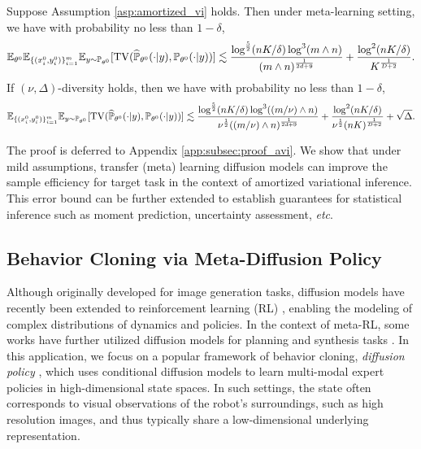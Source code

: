 \documentclass[11pt]{article}
\numberwithin{equation}{section}
\renewcommand{\P}{\mathbb{P}}
\begin{document}
\begin{thm}\label{thm:amortized_vi}
    Suppose Assumption \ref{asp:amortized_vi} holds. 
    Then under meta-learning setting, we have with probability no less than $1-\delta$,
    \begin{equation}
        \E_{\theta^0} \E_{\{(x_i^0,y_i^0)\}_{i=1}^m}\E_{y\sim\P_{\theta^0}}[\mathrm{TV}(\widehat{\P}_{\theta^0}(\cdot|y),\P_{\theta^0}(\cdot|y))]\lesssim 
        \frac{\log^{\frac{5}{2}}(nK/\delta)\log^3(m\wedge n)}{(m\wedge n)^{\frac{1}{2d+9}}}+\frac{\log^2(nK/\delta)}{K^{\frac{1}{D+2}}}.
    \end{equation}
    If $(\nu,\Delta)$-diversity holds, then we have with probability no less than $1-\delta$,
    \begin{equation}
        \E_{\{(x_i^0,y_i^0)\}_{i=1}^m}\E_{y\sim\P_{\theta^0}}[\mathrm{TV}(\widehat{\P}_{\theta^0}(\cdot|y),\P_{\theta^0}(\cdot|y))]\lesssim \frac{\log^{\frac{5}{2}}(nK/\delta)\log^3((m/\nu)\wedge n)}{\nu^{\frac{1}{2}}((m/\nu)\wedge n)^{\frac{1}{2d+9}}}+\frac{\log^2(nK/\delta)}{\nu^{\frac{1}{2}}(nK)^{\frac{1}{D+2}}}+\sqrt{\Delta}.
    \end{equation}
\end{thm}

The proof is deferred to Appendix \ref{app:subsec:proof_avi}.
We show that under mild assumptions, transfer (meta) learning diffusion models can improve the sample efficiency for target task in the context of amortized variational inference. 
This error bound can be further extended to establish guarantees for statistical inference such as moment prediction, uncertainty assessment, \textit{etc}.


\subsection{Behavior Cloning via Meta-Diffusion Policy}

Although originally developed for image generation tasks, diffusion models have recently been extended to reinforcement learning (RL) \citep{janner2022planning,chi2023diffusion,wang2022diffusion}, enabling the modeling of complex distributions of dynamics and policies.
In the context of meta-RL, some works have further utilized diffusion models for planning and synthesis tasks \citep{ni2023metadiffuser,he2023diffusion}.  
In this application, we focus on a popular framework of behavior cloning, \textit{diffusion policy} \citep{chi2023diffusion}, which uses conditional diffusion models to learn multi-modal expert policies in high-dimensional state spaces.
In such settings, the state often corresponds to visual observations of the robot's surroundings, such as high resolution images, and thus typically share a low-dimensional underlying representation.
\end{document}
